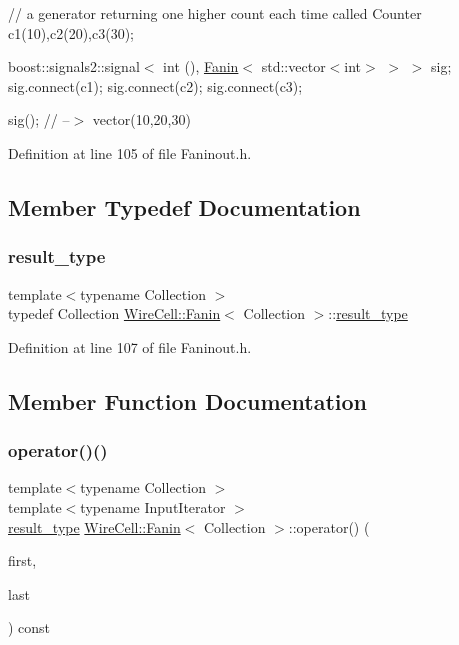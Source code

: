 // a generator returning one higher count each time called Counter c1(10),c2(20),c3(30);

boost\+::signals2\+::signal$<$ int (), \hyperlink{struct_wire_cell_1_1_fanin}{Fanin}$<$ std\+::vector$<$int$>$ $>$ $>$ sig; sig.\+connect(c1); sig.\+connect(c2); sig.\+connect(c3);

sig(); // --$>$ vector(10,20,30) 

Definition at line 105 of file Faninout.\+h.



\subsection{Member Typedef Documentation}
\mbox{\label{struct_wire_cell_1_1_fanin_aa5da112620a039252591b5d26e49bf7a}} 
\subsubsection{\texorpdfstring{result\+\_\+type}{result\_type}}
{\footnotesize\ttfamily template$<$typename Collection $>$ \\
typedef Collection \hyperlink{struct_wire_cell_1_1_fanin}{Wire\+Cell\+::\+Fanin}$<$ Collection $>$\+::\hyperlink{struct_wire_cell_1_1_fanin_aa5da112620a039252591b5d26e49bf7a}{result\+\_\+type}}



Definition at line 107 of file Faninout.\+h.



\subsection{Member Function Documentation}
\mbox{\label{struct_wire_cell_1_1_fanin_aad94a942146c713fb60d6b85046cbbb9}} 
\subsubsection{\texorpdfstring{operator()()}{operator()()}}
{\footnotesize\ttfamily template$<$typename Collection $>$ \\
template$<$typename Input\+Iterator $>$ \\
\hyperlink{struct_wire_cell_1_1_fanin_aa5da112620a039252591b5d26e49bf7a}{result\+\_\+type} \hyperlink{struct_wire_cell_1_1_fanin}{Wire\+Cell\+::\+Fanin}$<$ Collection $>$\+::operator() (\begin{DoxyParamCaption}\item[{Input\+Iterator}]{first,  }\item[{Input\+Iterator}]{last }\end{DoxyParamCaption}) const\hspace{0.3cm}{\ttfamily [inline]}}



